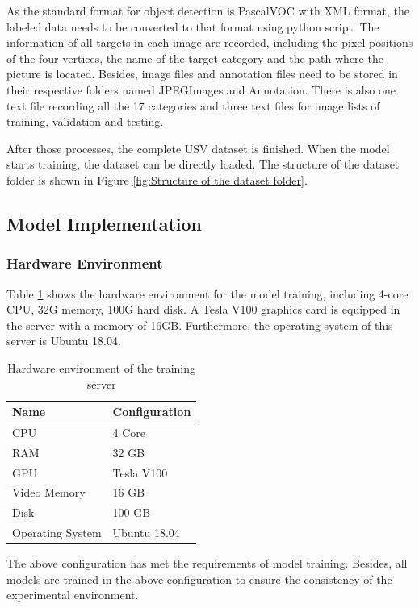 \documentclass[journal,article,submit,moreauthors,pdftex]{Definitions/mdpi}
\begin{document}
As the standard format for object detection is PascalVOC with XML format, the labeled data needs to be converted to that format using python script. The information of all targets in each image are recorded, including the pixel positions of the four vertices, the name of the target category and the path where the picture is located.
Besides, image files and annotation files need to be stored in their respective folders named JPEGImages and Annotation. There is also one text file recording all the 17 categories and three text files for image lists of training, validation and testing.

After those processes, the complete USV dataset is finished. When the model starts training, the dataset can be directly loaded. The structure of the dataset folder is shown in Figure \ref{fig:Structure of the dataset folder}.


\subsection{Model Implementation}

\subsubsection{Hardware Environment}

Table \ref{tbl:Hardware} shows the hardware environment for the model training, including 4-core CPU, 32G memory, 100G hard disk. A Tesla V100 graphics card is equipped in the server with a memory of 16GB. Furthermore, the operating system of this server is Ubuntu 18.04.

\begin{table}[htbp]
\centering
\caption{Hardware environment of the training server}
\begin{tabular}{ll} 
\toprule
\textbf{Name}&\textbf{Configuration}\\
\midrule
CPU& 4 Core \\
RAM& 32 GB \\
GPU& Tesla V100 \\
Video Memory& 16 GB\\
Disk& 100 GB\\
Operating System& Ubuntu 18.04\\
\bottomrule
\end{tabular}
\label{tbl:Hardware}
\end{table}

The above configuration has met the requirements of model training. Besides, all models are trained in the above configuration to ensure the consistency of the experimental environment.
\end{document}
